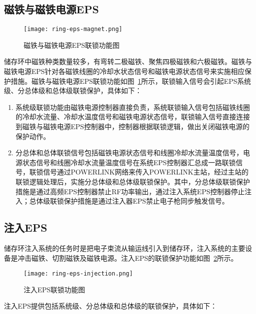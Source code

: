 \subsection{磁铁与磁铁电源EPS}

\begin{figure}[!htb]
	\centering
	\texttt{[image: ring-eps-magnet.png]}
	\caption{磁铁与磁铁电源EPS联锁功能图}
	\label{fig:ring-eps-magnet}
\end{figure}

储存环中磁铁种类数量较多，有弯转二极磁铁、聚焦四极磁铁和六极磁铁。磁铁与磁铁电源EPS针对各磁铁线圈的冷却水状态信号和磁铁电源状态信号来实施相应保护措施。磁铁与磁铁电源EPS联锁功能如图~\ref{fig:ring-eps-magnet}所示，联锁输入信号会引起EPS系统级、分总体级和总体级联锁保护，具体如下：

\begin{enumerate}
  \item 系统级联锁功能由磁铁电源控制器直接负责，系统联锁输入信号包括磁铁线圈的冷却水流量、冷却水温度信号和磁铁电源状态信号，联锁输入信号直接连接到磁铁与磁铁电源EPS控制器中，控制器根据联锁逻辑，做出关闭磁铁电源的保护动作。

  \item 分总体和总体联锁信号包括磁铁电源状态信号和线圈冷却水流量温度信号，电源状态信号和线圈冷却水流量温度信号在系统EPS控制器汇总成一路联锁信号，联锁信号通过POWERLINK网络来传入POWERLINK主站，经过主站的联锁逻辑处理后，实施分总体级和总体级联锁保护。其中，分总体级联锁保护措施是通过高频EPS控制器禁止RF功率输出，通过注入系统EPS控制器停止注入；总体级联锁保护措施是通过注入器EPS禁止电子枪同步触发信号。

\end{enumerate}

\subsection{注入EPS}
储存环注入系统的任务时是把电子束流从输运线引入到储存环，注入系统的主要设备是冲击磁铁、切割磁铁及磁铁电源。注入EPS的联锁保护功能如图~\ref{fig:ring-eps-injection}所示。

\begin{figure}[!htb]
	\centering
	\texttt{[image: ring-eps-injection.png]}
	\caption{注入EPS联锁功能图}
	\label{fig:ring-eps-injection}
\end{figure}

注入EPS提供包括系统级、分总体级和总体级的联锁保护，具体如下：

